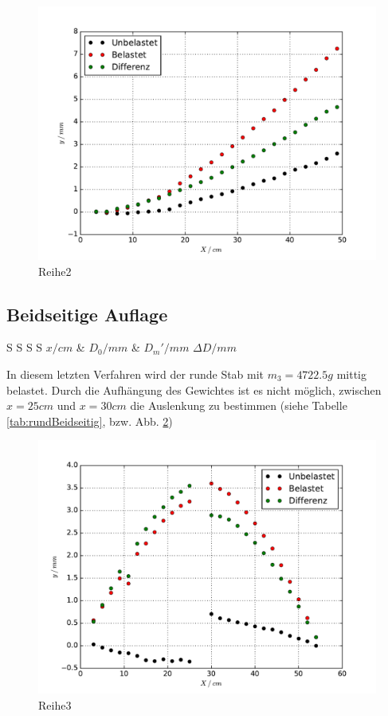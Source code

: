 \begin{figure}
  \centering
  \includegraphics[width=\textwidth]{./Plots/Reihe2.pdf}
  \caption{Reihe2}
  \label{fig:Reihe2}
\end{figure}
\FloatBarrier

\subsection{Beidseitige Auflage}
\label{sec:Beidseitig}

\begin{table}
  \centering
\caption{Auslenkung des runden Stabes bei beidseitiger Auflage}
\label{tab:rundBeidseitig}
\begin{tabular}{S S S S}
  \toprule
  {$x/cm$} & {$D_0/mm$} & {$D_m'/mm$} {$\Delta D/mm$}\\
  \midrule
\bottomrule
\end{tabular}
\end{table}
\FloatBarrier

In diesem letzten Verfahren wird der runde Stab mit $m_{3}=4722.5g$ mittig belastet. Durch die Aufhängung des Gewichtes ist es nicht möglich, zwischen $x = 25cm$ und $x = 30cm$ die Auslenkung zu bestimmen (siehe Tabelle \ref{tab:rundBeidseitig}, bzw. Abb. \ref{fig:Reihe3})

\begin{figure}
  \centering
  \includegraphics[width=\textwidth]{./Plots/Reihe3.pdf}
  \caption{Reihe3}
  \label{fig:Reihe3}
\end{figure}
